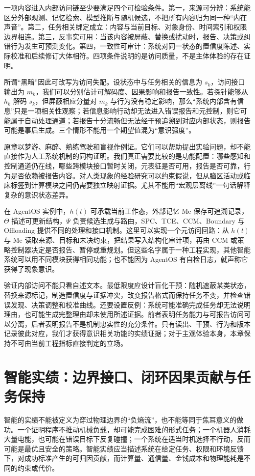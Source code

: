 一项内容进入内部访问链至少要满足四个可检验条件。第一，来源可分辨：系统能区分外部观测、记忆检索、模型推断与随机候选，不把所有内容归为同一种“内在声音”。第二，任务相关绑定成立：内容与当前目标、对象身份、时间索引和权限边界相连。第三，反事实可用：当该内容被屏蔽、替换或扰动时，报告、决策或纠错行为发生可预测变化。第四，一致性可审计：系统对同一状态的置信度陈述、实际校准和后续修订大体相符。四项条件说明的是访问质量，不是主体体验的存在证明。

所谓“黑暗”因此可改写为访问失配。设状态中与任务相关的信息为 $s_k$，访问接口输出为 $m_k$，我们可以分别估计可解码度、因果影响和报告一致性。若探针能够从 $h_k$ 解码 $s_k$，但屏蔽相应分量对 $m_k$ 与行为没有稳定影响，那么“系统内部含有信息”只是一项相关性观察；若信息影响行动却无法进入错误报告和元控制，则它可能属于自动处理通道；若报告十分流畅但无法经干预追溯到对应内部状态，则报告可能是事后生成。三个情形不能用一个期望值混为“意识强度”。

原章以梦游、麻醉、熟练驾驶和盲视作例证。它们可以帮助提出实验问题，却不能直接作为人工系统机制的同构证明。我们真正需要比较的是功能配置：哪些感知和控制通道仍在线，哪些跨模块接口暂时关闭，元表征是否可用，报告是否可靠，行为是否依赖被报告内容。对人类现象的经验研究可以约束假说，但从脑区活动或临床标签到计算模块之间仍需要独立映射证据。尤其不能用“宏观层离线”一句话解释复杂的意识状态差异。

在 AgentOS 实例中，$h(t)$ 可承载当前工作态，外部记忆 $\mathrm{Me}$ 保存可追溯记录，$\Theta$ 描述可更新结构，$\Psi$ 负责候选生成与路由，SPC、TCE、CCM、Boundary 与 Offloading 提供不同的处理和接口机制。这里可以实现一个元访问回路：从 $h(t)$ 与 $\mathrm{Me}$ 读取来源、目标和未决约束，把结果写入结构化审计项，再由 CCM 或策略控制器决定是否报告、暂停或重规划。但这些名字属于一种工程实现，其他智能系统可以用不同模块获得相同功能；也不能因为 AgentOS 有自检日志，就声称它获得了现象意识。

验证内部访问不能只看自述文本。最低限度应设计盲化干预：随机遮蔽某类状态，替换来源标记，制造置信度与证据冲突，改变报告格式而保持任务不变，并检查错误发现、决策调整和校准曲线。还要设置反例：系统可能准确完成任务却无法说明理由，也可能生成完整理由却未使用所述证据。前者表明任务能力与可报告访问可以分离，后者表明报告不是机制忠实性的充分条件。只有读出、干预、行为和版本记录彼此对应，我们才获得意识相关功能的实绩证据；对于主观体验本身，本章保持不可由当前工程指标直接判定的立场。

\section{智能实绩：边界接口、闭环因果贡献与任务保持}
\label{sec:section_5874}
智能的实绩不能被定义为穿过物理边界的“负熵流”，也不能等同于焦耳意义的做功。一个证明程序不推动机械负载，却可能完成困难的形式任务；一个机器人消耗大量电能，也可能在错误目标下反复碰撞；一个系统在适当时机选择不行动，反而可能是最优且安全的策略。智能实绩应当描述系统在给定任务、权限和环境反馈下，对成功标准产生的可归因贡献，而计算量、通信量、金钱成本和物理能耗是不同的约束或代价。

